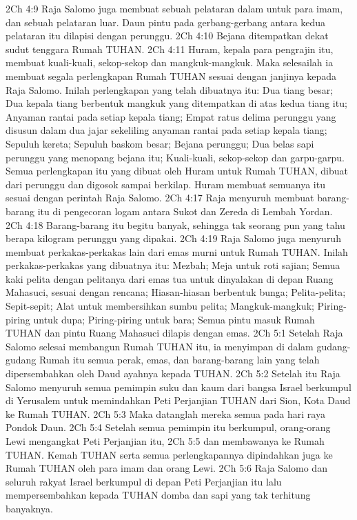 2Ch 4:9  Raja Salomo juga membuat sebuah pelataran dalam untuk para imam, dan sebuah pelataran luar. Daun pintu pada gerbang-gerbang antara kedua pelataran itu dilapisi dengan perunggu.
2Ch 4:10  Bejana ditempatkan dekat sudut tenggara Rumah TUHAN.
2Ch 4:11  Huram, kepala para pengrajin itu, membuat kuali-kuali, sekop-sekop dan mangkuk-mangkuk. Maka selesailah ia membuat segala perlengkapan Rumah TUHAN sesuai dengan janjinya kepada Raja Salomo. Inilah perlengkapan yang telah dibuatnya itu: Dua tiang besar; Dua kepala tiang berbentuk mangkuk yang ditempatkan di atas kedua tiang itu; Anyaman rantai pada setiap kepala tiang; Empat ratus delima perunggu yang disusun dalam dua jajar sekeliling anyaman rantai pada setiap kepala tiang; Sepuluh kereta; Sepuluh baskom besar; Bejana perunggu; Dua belas sapi perunggu yang menopang bejana itu; Kuali-kuali, sekop-sekop dan garpu-garpu. Semua perlengkapan itu yang dibuat oleh Huram untuk Rumah TUHAN, dibuat dari perunggu dan digosok sampai berkilap. Huram membuat semuanya itu sesuai dengan perintah Raja Salomo.
2Ch 4:17  Raja menyuruh membuat barang-barang itu di pengecoran logam antara Sukot dan Zereda di Lembah Yordan.
2Ch 4:18  Barang-barang itu begitu banyak, sehingga tak seorang pun yang tahu berapa kilogram perunggu yang dipakai.
2Ch 4:19  Raja Salomo juga menyuruh membuat perkakas-perkakas lain dari emas murni untuk Rumah TUHAN. Inilah perkakas-perkakas yang dibuatnya itu: Mezbah; Meja untuk roti sajian; Semua kaki pelita dengan pelitanya dari emas tua untuk dinyalakan di depan Ruang Mahasuci, sesuai dengan rencana; Hiasan-hiasan berbentuk bunga; Pelita-pelita; Sepit-sepit; Alat untuk membersihkan sumbu pelita; Mangkuk-mangkuk; Piring-piring untuk dupa; Piring-piring untuk bara; Semua pintu masuk Rumah TUHAN dan pintu Ruang Mahasuci dilapis dengan emas.
2Ch 5:1  Setelah Raja Salomo selesai membangun Rumah TUHAN itu, ia menyimpan di dalam gudang-gudang Rumah itu semua perak, emas, dan barang-barang lain yang telah dipersembahkan oleh Daud ayahnya kepada TUHAN.
2Ch 5:2  Setelah itu Raja Salomo menyuruh semua pemimpin suku dan kaum dari bangsa Israel berkumpul di Yerusalem untuk memindahkan Peti Perjanjian TUHAN dari Sion, Kota Daud ke Rumah TUHAN.
2Ch 5:3  Maka datanglah mereka semua pada hari raya Pondok Daun.
2Ch 5:4  Setelah semua pemimpin itu berkumpul, orang-orang Lewi mengangkat Peti Perjanjian itu,
2Ch 5:5  dan membawanya ke Rumah TUHAN. Kemah TUHAN serta semua perlengkapannya dipindahkan juga ke Rumah TUHAN oleh para imam dan orang Lewi.
2Ch 5:6  Raja Salomo dan seluruh rakyat Israel berkumpul di depan Peti Perjanjian itu lalu mempersembahkan kepada TUHAN domba dan sapi yang tak terhitung banyaknya.

